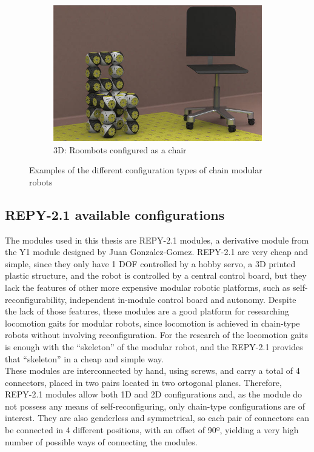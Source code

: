 \begin{figure}[h]
\begin{subfigure}[b]{0.3\textwidth}
         	   \centering
                \includegraphics[width=\textwidth]{images/Conf_3D_roombots.jpg}
                \caption{3D: Roombots configured as a chair}
                \label{fig:config_3D}
        \end{subfigure}
        \caption{Examples of the different configuration types of chain modular robots}
        \label{fig:config_chain_examples_extended}
\end{figure}



\subsection{REPY-2.1 available configurations}
\label{config_repy_confs}
The modules used in this thesis are REPY-2.1 modules, a derivative module from the Y1 module designed by Juan Gonzalez-Gomez. REPY-2.1 are very cheap and simple, since they only have 1 DOF controlled by a hobby servo, a 3D printed plastic structure, and the robot is controlled by a central control board, but they lack the features of other more expensive modular robotic platforms, such as self-reconfigurability, independent in-module control board and autonomy. Despite the lack of those features, these modules are a good platform for researching locomotion gaits for modular robots, since locomotion is achieved in chain-type robots without involving reconfiguration. For the research of the locomotion gaits is enough with the ``skeleton'' of the modular robot, and the REPY-2.1 provides that ``skeleton'' in a cheap and simple way.\\

These modules are interconnected by hand, using screws, and carry a total of 4 connectors, placed in two pairs located in two ortogonal planes. Therefore, REPY-2.1 modules allow both 1D and 2D configurations and, as the module do not possess any means of self-reconfiguring, only chain-type configurations are of interest. They are also genderless and symmetrical, so each pair of connectors can be connected in 4 different positions, with an offset of 90º, yielding a very high number of possible ways of connecting the modules.\\

